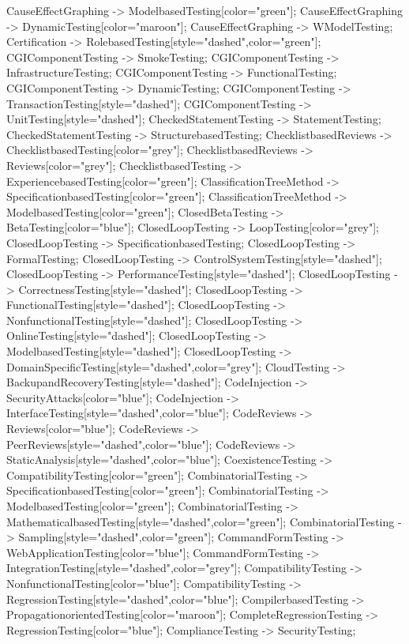 \documentclass{article}
\begin{document}
{CauseEffectGraphing -> ModelbasedTesting[color="green"];
CauseEffectGraphing -> DynamicTesting[color="maroon"];
CauseEffectGraphing -> WModelTesting;
Certification -> RolebasedTesting[style="dashed",color="green"];
CGIComponentTesting -> SmokeTesting;
CGIComponentTesting -> InfrastructureTesting;
CGIComponentTesting -> FunctionalTesting;
CGIComponentTesting -> DynamicTesting;
CGIComponentTesting -> TransactionTesting[style="dashed"];
CGIComponentTesting -> UnitTesting[style="dashed"];
CheckedStatementTesting -> StatementTesting;
CheckedStatementTesting -> StructurebasedTesting;
ChecklistbasedReviews -> ChecklistbasedTesting[color="grey"];
ChecklistbasedReviews -> Reviews[color="grey"];
ChecklistbasedTesting -> ExperiencebasedTesting[color="green"];
ClassificationTreeMethod -> SpecificationbasedTesting[color="green"];
ClassificationTreeMethod -> ModelbasedTesting[color="green"];
ClosedBetaTesting -> BetaTesting[color="blue"];
ClosedLoopTesting -> LoopTesting[color="grey"];
ClosedLoopTesting -> SpecificationbasedTesting;
ClosedLoopTesting -> FormalTesting;
ClosedLoopTesting -> ControlSystemTesting[style="dashed"];
ClosedLoopTesting -> PerformanceTesting[style="dashed"];
ClosedLoopTesting -> CorrectnessTesting[style="dashed"];
ClosedLoopTesting -> FunctionalTesting[style="dashed"];
ClosedLoopTesting -> NonfunctionalTesting[style="dashed"];
ClosedLoopTesting -> OnlineTesting[style="dashed"];
ClosedLoopTesting -> ModelbasedTesting[style="dashed"];
ClosedLoopTesting -> DomainSpecificTesting[style="dashed",color="grey"];
CloudTesting -> BackupandRecoveryTesting[style="dashed"];
CodeInjection -> SecurityAttacks[color="blue"];
CodeInjection -> InterfaceTesting[style="dashed",color="blue"];
CodeReviews -> Reviews[color="blue"];
CodeReviews -> PeerReviews[style="dashed",color="blue"];
CodeReviews -> StaticAnalysis[style="dashed",color="blue"];
CoexistenceTesting -> CompatibilityTesting[color="green"];
CombinatorialTesting -> SpecificationbasedTesting[color="green"];
CombinatorialTesting -> ModelbasedTesting[color="green"];
CombinatorialTesting -> MathematicalbasedTesting[style="dashed",color="green"];
CombinatorialTesting -> Sampling[style="dashed",color="green"];
CommandFormTesting -> WebApplicationTesting[color="blue"];
CommandFormTesting -> IntegrationTesting[style="dashed",color="grey"];
CompatibilityTesting -> NonfunctionalTesting[color="blue"];
CompatibilityTesting -> RegressionTesting[style="dashed",color="blue"];
CompilerbasedTesting -> PropagationorientedTesting[color="maroon"];
CompleteRegressionTesting -> RegressionTesting[color="blue"];
ComplianceTesting -> SecurityTesting;
}
\end{document}
